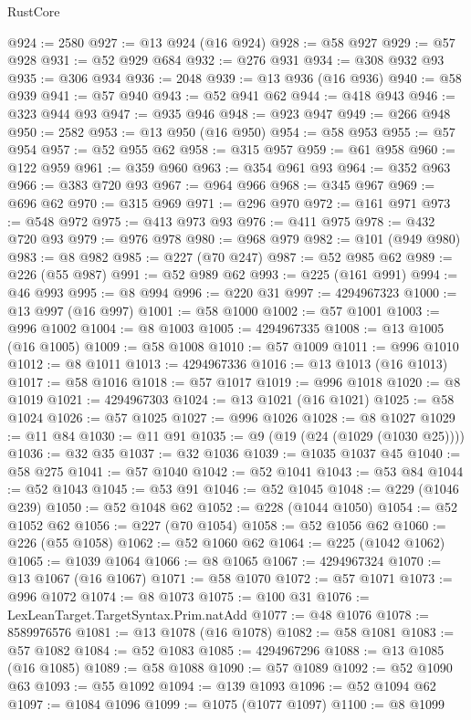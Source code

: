 \begin{lexlean}{RustCore}
\begin{coremodule}
@924 := 2580
@927 := @13 @924 (@16 @924)
@928 := @58 @927
@929 := @57 @928
@931 := @52 @929 @684
@932 := @276 @931
@934 := @308 @932 @93
@935 := @306 @934
@936 := 2048
@939 := @13 @936 (@16 @936)
@940 := @58 @939
@941 := @57 @940
@943 := @52 @941 @62
@944 := @418 @943
@946 := @323 @944 @93
@947 := @935 @946
@948 := @923 @947
@949 := @266 @948
@950 := 2582
@953 := @13 @950 (@16 @950)
@954 := @58 @953
@955 := @57 @954
@957 := @52 @955 @62
@958 := @315 @957
@959 := @61 @958
@960 := @122 @959
@961 := @359 @960
@963 := @354 @961 @93
@964 := @352 @963
@966 := @383 @720 @93
@967 := @964 @966
@968 := @345 @967
@969 := @696 @62
@970 := @315 @969
@971 := @296 @970
@972 := @161 @971
@973 := @548 @972
@975 := @413 @973 @93
@976 := @411 @975
@978 := @432 @720 @93
@979 := @976 @978
@980 := @968 @979
@982 := @101 (@949 @980)
@983 := @8 @982
@985 := @227 (@70 @247)
@987 := @52 @985 @62
@989 := @226 (@55 @987)
@991 := @52 @989 @62
@993 := @225 (@161 @991)
@994 := @46 @993
@995 := @8 @994
@996 := @220 @31
@997 := 4294967323
@1000 := @13 @997 (@16 @997)
@1001 := @58 @1000
@1002 := @57 @1001
@1003 := @996 @1002
@1004 := @8 @1003
@1005 := 4294967335
@1008 := @13 @1005 (@16 @1005)
@1009 := @58 @1008
@1010 := @57 @1009
@1011 := @996 @1010
@1012 := @8 @1011
@1013 := 4294967336
@1016 := @13 @1013 (@16 @1013)
@1017 := @58 @1016
@1018 := @57 @1017
@1019 := @996 @1018
@1020 := @8 @1019
@1021 := 4294967303
@1024 := @13 @1021 (@16 @1021)
@1025 := @58 @1024
@1026 := @57 @1025
@1027 := @996 @1026
@1028 := @8 @1027
@1029 := @11 @84
@1030 := @11 @91
@1035 := @9 (@19 (@24 (@1029 (@1030 @25))))
@1036 := @32 @35
@1037 := @32 @1036
@1039 := @1035 @1037 @45
@1040 := @58 @275
@1041 := @57 @1040
@1042 := @52 @1041
@1043 := @53 @84
@1044 := @52 @1043
@1045 := @53 @91
@1046 := @52 @1045
@1048 := @229 (@1046 @239)
@1050 := @52 @1048 @62
@1052 := @228 (@1044 @1050)
@1054 := @52 @1052 @62
@1056 := @227 (@70 @1054)
@1058 := @52 @1056 @62
@1060 := @226 (@55 @1058)
@1062 := @52 @1060 @62
@1064 := @225 (@1042 @1062)
@1065 := @1039 @1064
@1066 := @8 @1065
@1067 := 4294967324
@1070 := @13 @1067 (@16 @1067)
@1071 := @58 @1070
@1072 := @57 @1071
@1073 := @996 @1072
@1074 := @8 @1073
@1075 := @100 @31
@1076 := LexLeanTarget.TargetSyntax.Prim.natAdd
@1077 := @48 @1076
@1078 := 8589976576
@1081 := @13 @1078 (@16 @1078)
@1082 := @58 @1081
@1083 := @57 @1082
@1084 := @52 @1083
@1085 := 4294967296
@1088 := @13 @1085 (@16 @1085)
@1089 := @58 @1088
@1090 := @57 @1089
@1092 := @52 @1090 @63
@1093 := @55 @1092
@1094 := @139 @1093
@1096 := @52 @1094 @62
@1097 := @1084 @1096
@1099 := @1075 (@1077 @1097)
@1100 := @8 @1099

\end{coremodule}
\end{lexlean}
